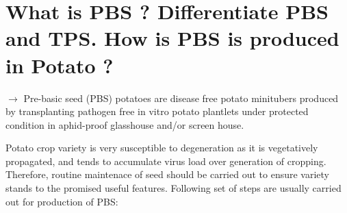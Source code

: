 \documentclass[
  openany]{book}
\begin{document}
\hypertarget{what-is-pbs-differentiate-pbs-and-tps.-how-is-pbs-is-produced-in-potato}{%
\section{What is PBS ? Differentiate PBS and TPS. How is PBS is produced in Potato ?}\label{what-is-pbs-differentiate-pbs-and-tps.-how-is-pbs-is-produced-in-potato}}

\(\longrightarrow\) Pre-basic seed (PBS) potatoes are disease free potato minitubers produced by transplanting pathogen free in vitro potato plantlets under protected condition in aphid-proof glasshouse and/or screen house.

Potato crop variety is very susceptible to degeneration as it is vegetatively propagated, and tends to accumulate virus load over generation of cropping. Therefore, routine maintenace of seed should be carried out to ensure variety stands to the promised useful features. Following set of steps are usually carried out for production of PBS:
\end{document}
